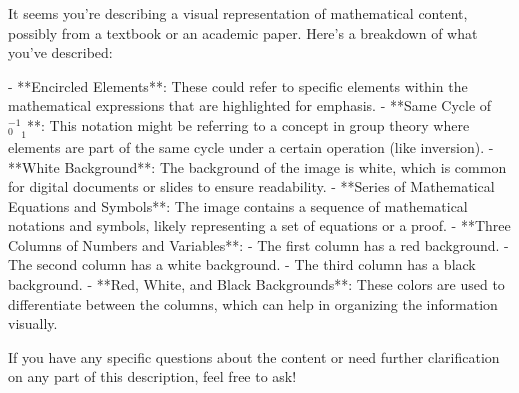 It seems you're describing a visual representation of mathematical content, possibly from a textbook or an academic paper. Here's a breakdown of what you've described:

- **Encircled Elements**: These could refer to specific elements within the mathematical expressions that are highlighted for emphasis.
- **Same Cycle of \(_0^{-1}_1\)**: This notation might be referring to a concept in group theory where elements are part of the same cycle under a certain operation (like inversion).
- **White Background**: The background of the image is white, which is common for digital documents or slides to ensure readability.
- **Series of Mathematical Equations and Symbols**: The image contains a sequence of mathematical notations and symbols, likely representing a set of equations or a proof.
- **Three Columns of Numbers and Variables**:
  - The first column has a red background.
  - The second column has a white background.
  - The third column has a black background.
- **Red, White, and Black Backgrounds**: These colors are used to differentiate between the columns, which can help in organizing the information visually.

If you have any specific questions about the content or need further clarification on any part of this description, feel free to ask!
